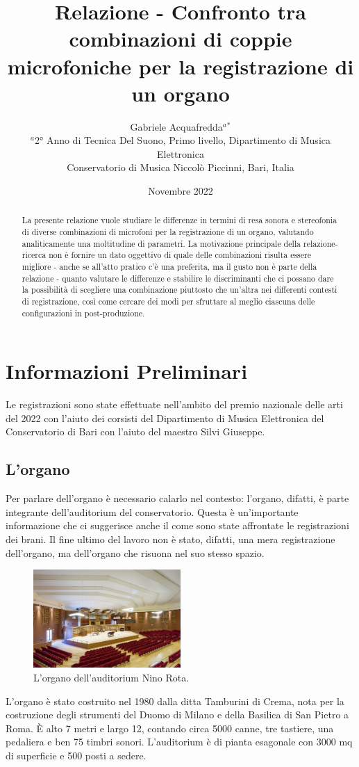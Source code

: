 \documentclass{article}
\title{Relazione - Confronto tra combinazioni di coppie microfoniche per la registrazione di un organo}
\author{Gabriele Acquafredda$^{a}$$^{*}$ \\
    \small $^{a}$2° Anno di Tecnica Del Suono, Primo livello, Dipartimento di Musica Elettronica\\
    \small  Conservatorio di Musica Niccolò Piccinni, Bari, Italia\\
}
\date{Novembre 2022}
\begin{document}
\maketitle

\begin{abstract} 
    \noindent La presente relazione vuole studiare le differenze in termini di resa sonora e stereofonia di diverse combinazioni di microfoni per la registrazione di un organo, valutando analiticamente una moltitudine di parametri. La motivazione principale della relazione-ricerca non è fornire un dato oggettivo di quale delle combinazioni risulta essere migliore - anche se all'atto pratico c'è una preferita, ma il gusto non è parte della relazione - quanto valutare le differenze e stabilire le discriminanti che ci possano dare la possibilità di scegliere una combinazione piuttosto che un'altra nei differenti contesti di registrazione, così come cercare dei modi per sfruttare al meglio ciascuna delle configurazioni in post-produzione.
\end{abstract}

\section{Informazioni Preliminari}

Le registrazioni sono state effettuate nell'ambito del premio nazionale delle arti del 2022 con l'aiuto dei corsisti del Dipartimento di Musica Elettronica del Conservatorio di Bari con l'aiuto del maestro Silvi Giuseppe. 

\subsection{L'organo}

    Per parlare dell'organo è necessario calarlo nel contesto: l'organo, difatti, è parte integrante dell'auditorium del conservatorio. Questa è un'importante informazione che ci suggerisce anche il come sono state affrontate le registrazioni dei brani. Il fine ultimo del lavoro non è stato, difatti, una mera registrazione dell'organo, ma dell'organo che risuona nel suo stesso spazio. 
    \begin{figure}[H]
        \centering
        \includegraphics[width=0.5\textwidth]{images/auditorium-organo.jpg}
        \caption{\label{fig1}L'organo dell'auditorium Nino Rota.}
    \end{figure}
    \noindent L'organo è stato costruito nel 1980 dalla ditta Tamburini di Crema, nota per la costruzione degli strumenti del Duomo di Milano e della Basilica di San Pietro a Roma. È alto 7 metri e largo 12, contando circa 5000 canne, tre tastiere, una pedaliera e ben 75 timbri sonori.
    L'auditorium è di pianta esagonale con 3000 mq di superficie e 500 posti a sedere.
\end{document}
